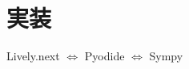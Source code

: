\chapter{実装}

Lively.next\cite{Lively.next}
$\Leftrightarrow$
Pyodide\cite{Pyodide}
$\Leftrightarrow$
Sympy\cite{SymPy}



